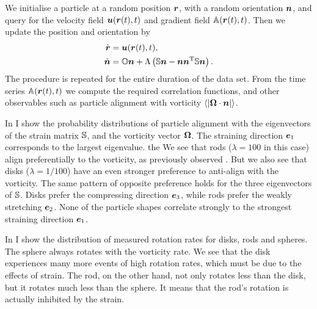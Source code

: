 \documentclass[thesis.tex]{subfiles}
\begin{document}
We initialise a particle at a random position $\mbox{\boldmath$r$}$, with a random orientation $\mbox{\boldmath$n$}$, and query for the velocity field $\mbox{\boldmath$u$}(\mbox{\boldmath$r$}(t), t)$ and gradient field $\mathbb{A}(\mbox{\boldmath$r$}(t), t)$. Then we update the position and orientation by
\begin{align*}
	\dot {\mbox{\boldmath$r$}} &= \mbox{\boldmath$u$}(\mbox{\boldmath$r$}(t), t), \\
	\dot {\mbox{\boldmath$n$}} &= \mathbb{O} \mbox{\boldmath$n$} + \Lambda\left(\mathbb{S} \mbox{\boldmath$n$} - \mbox{\boldmath$n$} \mbox{\boldmath$n$}^{\mathrm T} \mathbb{S} \mbox{\boldmath$n$}\right).
\end{align*}
The procedure is repeated for the entire duration of the data set. From the time series $\mathbb{A}(\mbox{\boldmath$r$}(t), t)$ we compute the required correlation functions, and other observables such as particle alignment with vorticity $\langle|\mbox{\boldmath$\Omega$} \cdot \mbox{\boldmath$n$}|\rangle$.


In  I show the probability distributions of particle alignment with the eigenvectors of the strain matrix $\mathbb{S}$, and the vorticity vector $\mbox{\boldmath$\Omega$}$. The straining direction $\mbox{\boldmath$e$}_1$ corresponds to the largest eigenvalue. the We see that rods ($\lambda=100$ in this case) align preferentially to the vorticity, as previously observed \cite{pumir2011}. But we also see that disks ($\lambda=1/100$) have an even stronger preference to anti-align with the vorticity. The same pattern of opposite preference holds for the three eigenvectors of $\mathbb{S}$. Disks prefer the compressing direction $\mbox{\boldmath$e$}_3$, while rods prefer the weakly stretching $\mbox{\boldmath$e$}_2$. None of the particle shapes correlate strongly to the strongest straining direction $\mbox{\boldmath$e$}_1$.

In  I show the distribution of measured rotation rates for disks, rods and spheres. 
The sphere always rotates with the vorticity rate. We see that the disk experiences many more events of high rotation rates, which must be due to the effects of strain. The rod, on the other hand, not only rotates less than the disk, but it rotates much less than the sphere. It means that the rod's rotation is actually inhibited by the strain.
\end{document}
